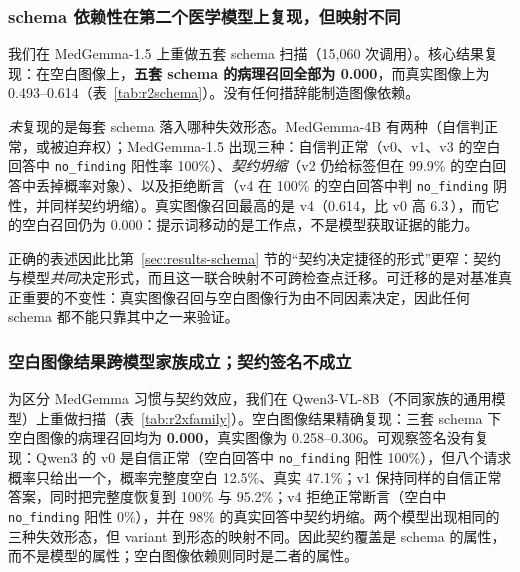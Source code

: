 \subsubsection{schema 依赖性在第二个医学模型上复现，但映射不同}
\label{sec:results-schema2}

我们在 MedGemma-1.5 上重做五套 schema 扫描（15,060 次调用）。核心结果复现：在空白图像上，\textbf{五套 schema 的病理召回全部为 0.000}，而真实图像上为 0.493--0.614（表~\ref{tab:r2schema}）。没有任何措辞能制造图像依赖。

\emph{未}复现的是每套 schema 落入哪种失效形态。MedGemma-4B 有两种（自信判正常，或被迫弃权）；MedGemma-1.5 出现三种：自信判正常（v0、v1、v3 的空白回答中 \texttt{no\_finding} 阳性率 100\%）、\emph{契约坍缩}（v2 仍给标签但在 99.9\% 的空白回答中丢掉概率对象）、以及拒绝断言（v4 在 100\% 的空白回答中判 \texttt{no\_finding} 阴性，并同样契约坍缩）。真实图像召回最高的是 v4（0.614，比 v0 高 6.3\,\pp{}），而它的空白召回仍为 0.000：提示词移动的是工作点，不是模型获取证据的能力。

正确的表述因此比第~\ref{sec:results-schema} 节的``契约决定捷径的形式''更窄：契约与模型\emph{共同}决定形式，而且这一联合映射不可跨检查点迁移。可迁移的是对基准真正重要的不变性：真实图像召回与空白图像行为由不同因素决定，因此任何 schema 都不能只靠其中之一来验证。

\subsubsection{空白图像结果跨模型家族成立；契约签名不成立}
\label{sec:results-xfamily}

为区分 MedGemma 习惯与契约效应，我们在 Qwen3-VL-8B（不同家族的通用模型）上重做扫描（表~\ref{tab:r2xfamily}）。空白图像结果精确复现：三套 schema 下空白图像的病理召回均为 \textbf{0.000}，真实图像为 0.258--0.306。可观察签名没有复现：Qwen3 的 v0 是自信正常（空白回答中 \texttt{no\_finding} 阳性 100\%），但八个请求概率只给出一个，概率完整度空白 12.5\%、真实 47.1\%；v1 保持同样的自信正常答案，同时把完整度恢复到 100\% 与 95.2\%；v4 拒绝正常断言（空白中 \texttt{no\_finding} 阳性 0\%），并在 98\% 的真实回答中契约坍缩。两个模型出现相同的三种失效形态，但 variant 到形态的映射不同。因此契约覆盖是 schema 的属性，而不是模型的属性；空白图像依赖则同时是二者的属性。

